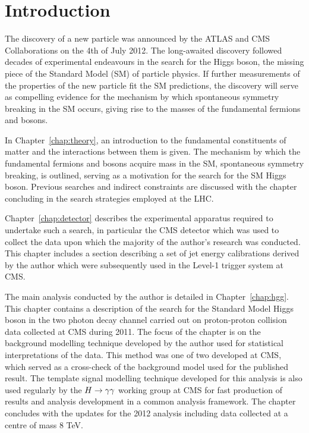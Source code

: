 \section{Introduction}
\label{introduction}

The discovery of a new particle was announced by the ATLAS and CMS
Collaborations on the 4th of July 2012. The long-awaited discovery 
followed decades of experimental endeavours in the search for the
Higgs boson, the missing piece of the Standard Model (SM) of particle physics.
If further measurements of the properties of the new particle fit the SM predictions, 
the discovery will serve as compelling evidence for the mechanism by which
spontaneous symmetry breaking in the SM occurs, giving rise
to the masses of the fundamental fermions and bosons. 

In Chapter~\ref{chap:theory}, an introduction to the fundamental constituents of
matter and the interactions between them is given. The mechanism by which 
the fundamental fermions and bosons acquire mass in the SM, spontaneous symmetry breaking,
is outlined, serving as a motivation for the search for the SM Higgs boson. 
Previous searches and indirect constraints are discussed with the chapter concluding in
the search strategies employed at the LHC.

Chapter~\ref{chap:detector} describes the experimental apparatus required to undertake 
such a search, in particular the CMS detector which was used to collect the data upon which 
the majority of the author's research was conducted. This chapter includes a section describing 
a set of jet energy calibrations derived by the author which were subsequently used  
in the Level-1 trigger system at CMS.

The main analysis conducted by the author is detailed in Chapter~\ref{chap:hgg}. This chapter 
contains a description of the search for the Standard Model Higgs boson in the two
photon decay channel carried out on proton-proton collision data collected at CMS during 2011.
The focus of the chapter is on the background modelling technique developed by the author
used for statistical interpretations of the data. This method was one of two developed at CMS, 
which served as a cross-check of the background model used for the published result. 
The template signal modelling technique developed for this analysis is also used regularly by the $H\rightarrow\gamma\gamma$
working group at CMS for fast production of results and analysis development in a common analysis framework.
The chapter concludes with the updates for the 2012 analysis including data
collected at a centre of mass 8 TeV. 

